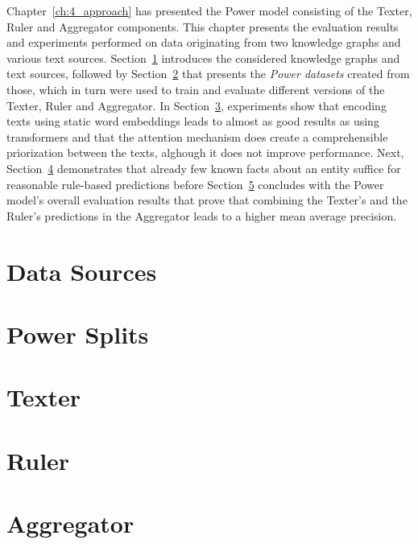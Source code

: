 Chapter~\ref{ch:4_approach} has presented the Power model consisting of the Texter, Ruler and Aggregator components. This chapter presents the evaluation results and experiments performed on data originating from two knowledge graphs and various text sources. Section~\ref{sec:5_experiments/1_data_sources} introduces the considered knowledge graphs and text sources, followed by Section~\ref{sec:5_experiments/2_power_splits} that presents the \emph{Power datasets} created from those, which in turn were used to train and evaluate different versions of the Texter, Ruler and Aggregator. In Section~\ref{sec:5_experiments/3_texter}, experiments show that encoding texts using static word embeddings leads to almost as good results as using transformers and that the attention mechanism does create a comprehensible priorization between the texts, alghough it does not improve performance. Next, Section~\ref{sec:5_experiments/4_ruler} demonstrates that already few known facts about an entity suffice for reasonable rule-based predictions before Section~\ref{sec:5_experiments/5_aggregator} concludes with the Power model's overall evaluation results that prove that combining the Texter's and the Ruler's predictions in the Aggregator leads to a higher mean average precision.


\section{Data Sources}
\label{sec:5_experiments/1_data_sources}



\section{Power Splits}
\label{sec:5_experiments/2_power_splits}



\section{Texter}
\label{sec:5_experiments/3_texter}



\section{Ruler}
\label{sec:5_experiments/4_ruler}



\section{Aggregator}
\label{sec:5_experiments/5_aggregator}

